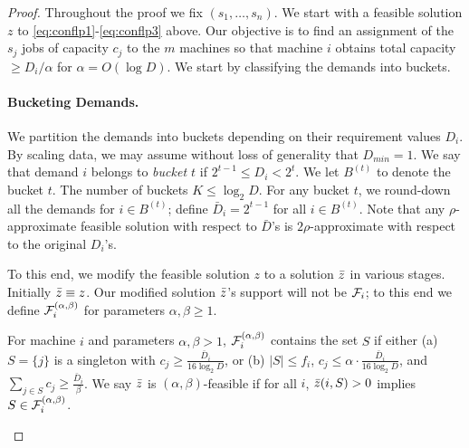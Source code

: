 \documentclass{article}[11pt]
\newcommand{\brt}{{(t)}}
\newcommand{\barD}{\bar{D}}
\begin{document}
\begin{proof}
	Throughout the proof we fix $(s_1,\ldots,s_n)$. 
	We start with a feasible solution $z$ to \eqref{eq:conflp1}-\eqref{eq:conflp3} above. 
	Our objective is to find an assignment of the $s_j$ jobs of capacity $c_j$ to the $m$ machines so that machine $i$ obtains total capacity $\geq D_i/\alpha$ for $\alpha = O(\log D)$. 	  
	We start by classifying the demands into buckets.
	
	\paragraph{Bucketing Demands.} We partition the demands into buckets depending on their requirement values $D_i$. By scaling data, we may assume without loss of generality that $D_{min} = 1$. 
	We say that demand $i$ belongs to \emph{bucket $t$} if $2^{t-1} \leq D_i < 2^t$. We let $B^\brt$ to denote the bucket $t$. The number of buckets $K \leq \log_2 D$. 
	For any bucket $t$, we round-down all the demands for $i\in B^\brt$; define $\barD_i = 2^{t-1}$ for all $i\in B^\brt$. Note that any $\rho$-approximate feasible solution with respect to $\barD$'s is $2\rho$-approximate with respect to the original $D_i$'s. \smallskip
	
	
	
	
	\noindent
	To this end, we modify the feasible solution $z$ to a solution $\bar z$  in various stages. Initially $\bar z \equiv z$. 
	Our modified solution $\bar z$'s support will not be ${\cal F}_i$; to this end we define ${\cal F}^{(\alpha,\beta)}_i$ for parameters $\alpha,\beta \geq 1$.
	\begin{definition}
		For machine $i$ and parameters $\alpha,\beta > 1$, ${\cal F}^{(\alpha,\beta)}_i$ contains the set $S$ if either (a) $S = \{j\}$ is a singleton with $c_j \geq \frac{\barD_i}{16\log_2 D}$, 
		or (b) $|S|\leq f_i$, $c_j \leq \alpha \cdot \frac{\barD_i}{16\log_2 D}$, and $\sum_{j\in S} c_j \geq \frac{\barD_i}{\beta}$. 	    We say $\bar z$ is $(\alpha,\beta)$-feasible if for all $i$, $\bar z(i,S) > 0$ implies $S\in {\cal F}^{(\alpha,\beta)}_i$.
	\end{definition}
	\noindent
	
	\medskip
	
	

\end{proof}
\end{document}
